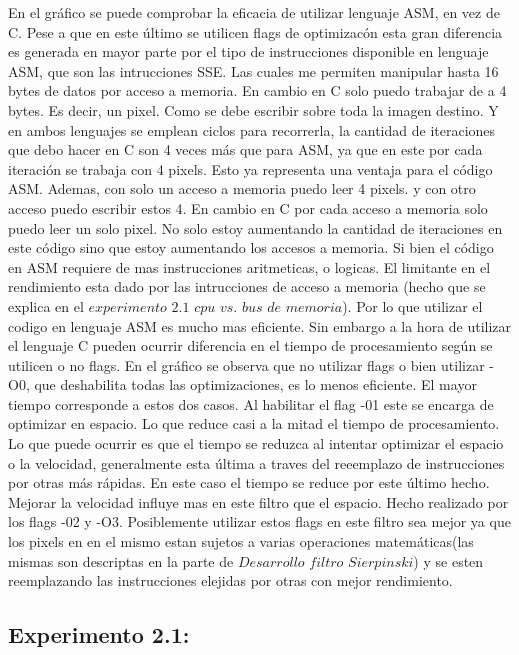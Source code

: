 \documentclass[a4paper]{article}
\begin{document}
En el gráfico se puede comprobar la eficacia de utilizar lenguaje ASM, en vez de C. Pese a que en este último se utilicen flags de optimizacón esta gran diferencia es generada en mayor parte por el tipo de instrucciones disponible en lenguaje ASM, que son las intrucciones SSE. Las cuales me permiten manipular hasta 16 bytes de datos por acceso a memoria. En cambio en C solo puedo trabajar de a 4 bytes. Es decir, un pixel. Como se debe escribir sobre toda la imagen destino. Y en ambos lenguajes se emplean ciclos para recorrerla, la cantidad de iteraciones que debo hacer en C son 4 veces más que para ASM, ya que en este por cada iteración se trabaja con 4 pixels. Esto ya representa una ventaja para el código ASM. Ademas, con solo un acceso a memoria puedo leer 4 pixels. y con otro acceso puedo escribir estos 4. En cambio en C por cada acceso a memoria solo puedo leer un solo pixel. No solo estoy aumentando la cantidad de iteraciones en este código sino que estoy aumentando los accesos a memoria. Si bien el código en ASM requiere de mas instrucciones aritmeticas, o logicas. El limitante en el rendimiento esta dado por las intrucciones de acceso a memoria (hecho que se explica en el $experimento$ $2.1$ $cpu$ $vs.$ $bus$ $de$ $memoria$). Por lo que utilizar el codigo en lenguaje ASM es mucho mas eficiente. Sin embargo a la hora de utilizar el lenguaje C pueden ocurrir diferencia en el tiempo de procesamiento según se utilicen o no flags. En el gráfico se observa que no utilizar flags o bien utilizar -O0, que deshabilita todas las optimizaciones, es lo menos eficiente. El mayor tiempo corresponde a estos dos casos. Al habilitar el flag -01 este se encarga de optimizar en espacio. Lo que reduce casi a la mitad el tiempo de procesamiento. Lo que puede ocurrir es que el tiempo se reduzca al intentar optimizar el espacio o la velocidad, generalmente esta última a traves del reeemplazo de instrucciones por otras más rápidas. En este caso el tiempo se reduce por este último hecho. Mejorar la velocidad influye mas en  este filtro que el espacio. Hecho realizado por los flags -02 y -O3. Posiblemente  utilizar estos flags en este filtro sea mejor ya que los pixels en en el mismo estan sujetos a varias operaciones matemáticas(las mismas son descriptas en la parte de $Desarrollo$ $filtro$ $Sierpinski$) y se esten reemplazando las instrucciones elejidas por otras con mejor rendimiento.


\subsection{Experimento 2.1:}
\end{document}
